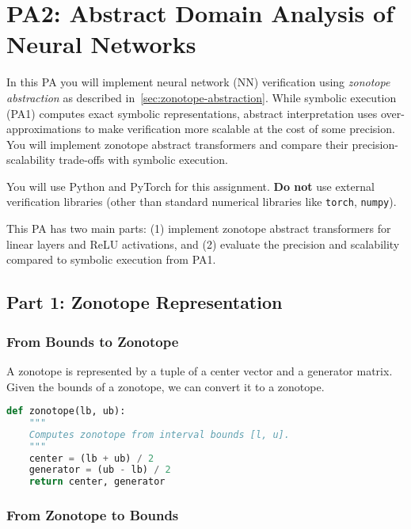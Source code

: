 \section{PA2: Abstract Domain Analysis of Neural Networks}\label{sec:pa2}

In this PA you will implement neural network (NN) verification using \emph{zonotope abstraction} as described in~\autoref{sec:zonotope-abstraction}. While symbolic execution (PA1) computes exact symbolic representations, abstract interpretation uses over-approximations to make verification more scalable at the cost of some precision. You will implement zonotope abstract transformers and compare their precision-scalability trade-offs with symbolic execution.

You will use Python and PyTorch for this assignment. \textbf{Do not} use external verification libraries (other than standard numerical libraries like \texttt{torch}, \texttt{numpy}).

This PA has two main parts: (1) implement zonotope abstract transformers for linear layers and ReLU activations, and (2) evaluate the precision and scalability compared to symbolic execution from PA1.


\subsection{Part 1: Zonotope Representation}

\subsubsection{From Bounds to Zonotope}

A zonotope is represented by a tuple of a center vector and a generator matrix. 
Given the bounds of a zonotope, we can convert it to a zonotope.
\begin{lstlisting}[language=Python]
def zonotope(lb, ub):
    """
    Computes zonotope from interval bounds [l, u].
    """
    center = (lb + ub) / 2
    generator = (ub - lb) / 2
    return center, generator
\end{lstlisting}

\subsubsection{From Zonotope to Bounds}

